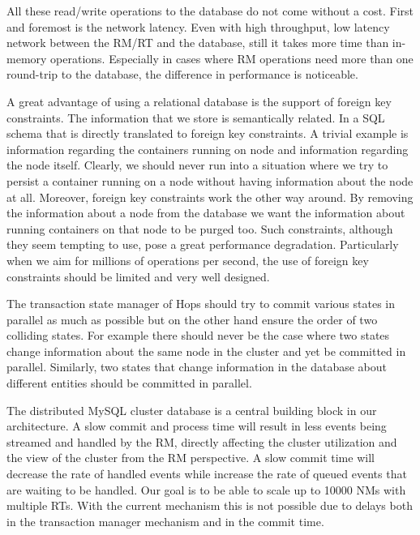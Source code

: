 All these read/write operations to the database do not come without
a cost. First and foremost is the network latency. Even with high
throughput, low latency network between the RM/RT and the database, still
it takes more time than in-memory operations. Especially in cases
where RM operations need more than one round-trip to the database, the
difference in performance is noticeable.

A great advantage of using a relational database is the support of
foreign key constraints. The information that we store is semantically
related. In a SQL schema that is directly translated to foreign key
constraints. A trivial example is information regarding the containers
running on node and information regarding the node itself. Clearly, we
should never run into a situation where we try to persist a container
running on a node without having information about the node at
all. Moreover, foreign key constraints work the other way around. By
removing the information about a node from the database we want the
information about running containers on that node to be purged
too. Such constraints, although they seem tempting to use, pose a
great performance degradation. Particularly when we aim for millions
of operations per second, the use of foreign key constraints should be
limited and very well designed.

The transaction state manager of Hops should try to commit
various states in parallel as much as possible but on the other hand
ensure the order of two colliding states. For example there should
never be the case where two states change information about the same
node in the cluster and yet be committed in parallel. Similarly, two
states that change information in the database about different
entities should be committed in parallel.

The distributed MySQL cluster database is a central building block in our
architecture. A slow commit and process time will result in less events being
streamed and handled by the RM, directly affecting the cluster
utilization and the view of the cluster from the RM perspective.
A slow commit time will decrease the
rate of handled events while increase the rate of queued events that
are waiting to be handled. Our goal is to be able to scale up to 10000 NMs
with multiple RTs. With the current mechanism this is not possible due
to delays both in the transaction manager mechanism and in the commit
time.